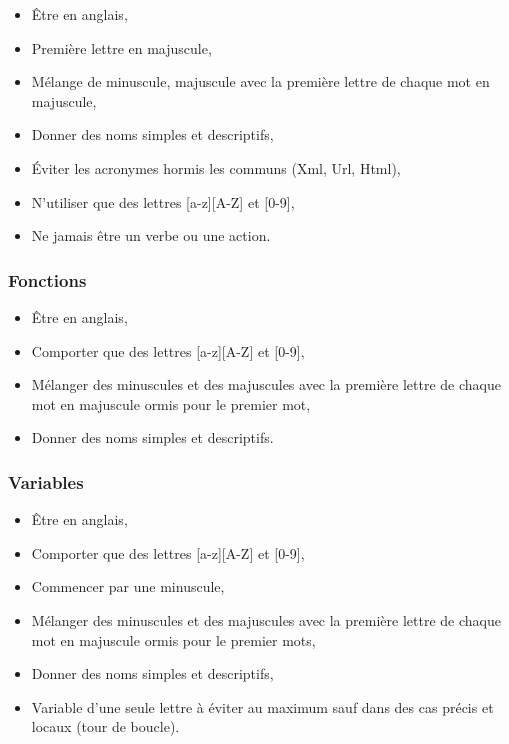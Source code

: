 \begin{itemize}[label=\textbullet]
  \item Être en anglais,
  \item Première lettre en majuscule,
  \item Mélange de minuscule, majuscule avec la première lettre de chaque mot en majuscule,
  \item Donner des noms simples et descriptifs,
  \item Éviter les acronymes hormis les communs (Xml, Url, Html),
  \item N'utiliser que des lettres [a-z][A-Z] et [0-9],
  \item Ne jamais être un verbe ou une action.
\end{itemize}

\subsubsection{Fonctions}
\label{nommageFonctions}

\begin{itemize}[label=\textbullet]
  \item Être en anglais,
  \item Comporter que des lettres [a-z][A-Z] et [0-9],
  \item Mélanger des minuscules et des majuscules avec la première lettre de chaque mot en majuscule ormis pour le premier mot,
  \item Donner des noms simples et descriptifs.
\end{itemize}
\subsubsection{Variables}
\label{nommageVariables}

\begin{itemize}[label=\textbullet]
  \item Être en anglais,
  \item Comporter que des lettres [a-z][A-Z] et [0-9],
  \item Commencer par une minuscule,
  \item Mélanger des minuscules et des majuscules avec la première lettre de chaque mot en majuscule ormis pour le premier mots,
  \item Donner des noms simples et descriptifs,
  \item Variable d'une seule lettre à éviter au maximum sauf dans des cas précis et locaux (tour de boucle).
\end{itemize}

